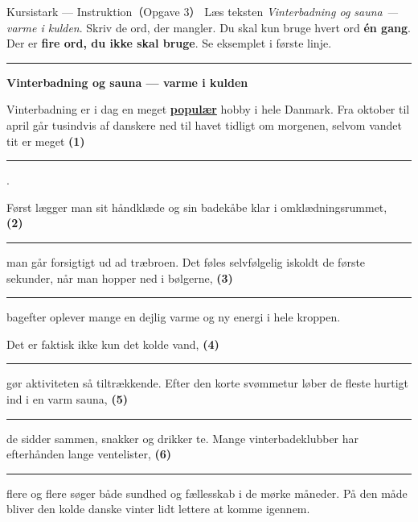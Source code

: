 \begin{emailbox}{Kursistark --- Instruktion（Opgave 3）}
Læs teksten \textit{Vinterbadning og sauna --- varme i kulden}. Skriv de ord, der mangler. Du skal kun bruge hvert ord \textbf{én gang}. Der er \textbf{fire ord, du ikke skal bruge}. Se eksemplet i første linje.

\vspace{0.35em}
\hrule
\vspace{0.4em}

\textbf{Vinterbadning og sauna --- varme i kulden}

\vspace{0.25em}
Vinterbadning er i dag en meget \underline{\textbf{populær}} hobby i hele Danmark. Fra oktober til april går tusindvis af danskere ned til havet tidligt om morgenen, selvom vandet tit er meget \textbf{(1)}\ \rule{2.1cm}{0.4pt}.

\vspace{0.3em}
Først lægger man sit håndklæde og sin badekåbe klar i omklædningsrummet, \textbf{(2)}\ \rule{2.1cm}{0.4pt} man går forsigtigt ud ad træbroen. Det føles selvfølgelig iskoldt de første sekunder, når man hopper ned i bølgerne, \textbf{(3)}\ \rule{2.1cm}{0.4pt} bagefter oplever mange en dejlig varme og ny energi i hele kroppen.

\vspace{0.3em}
Det er faktisk ikke kun det kolde vand, \textbf{(4)}\ \rule{2.1cm}{0.4pt} gør aktiviteten så tiltrækkende. Efter den korte svømmetur løber de fleste hurtigt ind i en varm sauna, \textbf{(5)}\ \rule{2.1cm}{0.4pt} de sidder sammen, snakker og drikker te. Mange vinterbadeklubber har efterhånden lange ventelister, \textbf{(6)}\ \rule{2.1cm}{0.4pt} flere og flere søger både sundhed og fællesskab i de mørke måneder. På den måde bliver den kolde danske vinter lidt lettere at komme igennem.

\vspace{0.5em}
\begin{center}
\end{center}
\end{emailbox}

